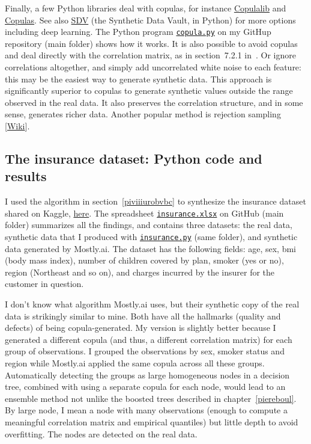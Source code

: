 \documentclass[oneside,10pt]{book}
\begin{document}
Finally, a few Python libraries
  deal with copulas, for instance \href{https://pypi.org/project/copulalib/}{Copulalib} and \href{https://pypi.org/project/copulas/}{Copulas}. See also \href{https://pypi.org/project/sdv/}{SDV} (the Synthetic Data Vault, in Python) for more options including deep learning. The Python program \href{https://github.com/VincentGranville/Main/blob/main/copula.py}{\texttt{copula.py}} on my GitHup repository (main folder)
shows how it works. It is also possible to avoid copulas and deal directly with the correlation matrix, as in section~7.2.1 in~\cite{vgelsevier}. Or ignore correlations altogether, and simply add uncorrelated white noise to each feature: this may be the easiest way to generate synthetic data. This approach is
 significantly superior to copulas
  to generate synthetic values outside the range observed in the real data. It also preserves the correlation structure, and in some sense, generates richer data. Another popular method is \textcolor{index}{rejection sampling} [\href{https://en.wikipedia.org/wiki/Rejection_sampling}{Wiki}].

\subsection{The insurance dataset: Python code and results}\label{sdsvc}

I used the algorithm in section~\ref{piviiiurobvbc} to synthesize the insurance dataset shared on Kaggle,
 \href{https://www.kaggle.com/datasets/teertha/ushealthinsurancedataset}{here}. The spreadsheet
\href{https://github.com/VincentGranville/Main/blob/main/insurance.xlsx}{\texttt{insurance.xlsx}} on GitHub (main folder) summarizes all the findings, and contains three datasets: the real data, synthetic data that I produced with
 \href{https://github.com/VincentGranville/Main/blob/main/insurance.py}{\texttt{insurance.py}} (same folder), and synthetic data generated by Mostly.ai. The dataset has the following fields: age, sex, bmi (body mass index), number of children covered by plan, smoker (yes or no),
 region (Northeast and so on), and charges incurred by the insurer for the customer in question.

I don't know what algorithm Mostly.ai uses,
  but their synthetic copy of the real data is strikingly similar to mine. Both have all the hallmarks (quality and defects) of being copula-generated. My version is slightly better because I generated a different copula (and thus, a different correlation matrix) for each group of observations. I grouped the observations by sex, smoker status and region while Mostly.ai applied the same copula across all these groups.
Automatically detecting the groups as large homogeneous \textcolor{index}{nodes} in a decision tree, combined with using a separate copula for each node, would lead to an \textcolor{index}{ensemble method} not unlike the \textcolor{index}{boosted trees} described in chapter~\ref{piereboul}.  By large node, I mean a node with many observations  (enough to compute a meaningful correlation matrix and empirical quantiles) but little depth to avoid overfitting. The nodes are detected on the real data.
\end{document}
